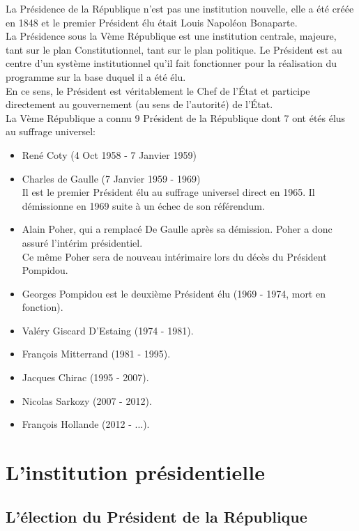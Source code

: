 \documentclass[12pt, a4paper, openany]{book}
\begin{document}
La Présidence de la République n'est pas une institution nouvelle, elle a été créée en 1848 et le premier Président élu était Louis Napoléon Bonaparte. \\
La Présidence sous la Vème République est une institution centrale, majeure, tant sur le plan Constitutionnel, tant sur le plan politique. Le Président est au centre d'un système institutionnel qu'il fait fonctionner pour la réalisation du programme sur la base duquel il a été élu. \\
En ce sens, le Président est véritablement le Chef de l'État et participe directement au gouvernement (au sens de l'autorité) de l'État. \\
La Vème République a connu 9 Président de la République dont 7 ont étés élus au suffrage universel:

\begin{itemize}
\item René Coty (4 Oct 1958 - 7 Janvier 1959) 
\item Charles de Gaulle (7 Janvier 1959 - 1969) \\
Il est le premier Président élu au suffrage universel direct en 1965. Il démissionne en 1969 suite à un échec de son référendum. 
\item Alain Poher, qui a remplacé De Gaulle après sa démission. Poher a donc assuré l'intérim présidentiel. \\
Ce même Poher sera de nouveau intérimaire lors du décès du Président Pompidou.
\item Georges Pompidou est le deuxième Président élu (1969 - 1974, mort en fonction).
\item Valéry Giscard D'Estaing (1974 - 1981).
\item François Mitterrand (1981 - 1995). 
\item Jacques Chirac (1995 - 2007).
\item Nicolas Sarkozy (2007 - 2012).
\item François Hollande (2012 - ...).
\end{itemize}


\section{L'institution présidentielle}

\subsection{L'élection du Président de la République}
\end{document}
